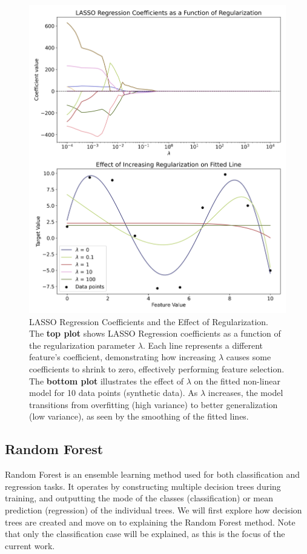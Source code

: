 \documentclass[english,11pt,a4paper,titlepage]{article}
\begin{document}
	\begin{figure}[!t]
		\centering
		\includegraphics[width=1.0\linewidth]{img/lasso_lambda_effect}
		\caption{LASSO Regression Coefficients and the Effect of Regularization. \\ The \textbf{top plot} shows LASSO Regression coefficients as a function of the regularization parameter $\lambda$. Each line represents a different feature's coefficient, demonstrating how increasing $\lambda$ causes some coefficients to shrink to zero, effectively performing feature selection. The \textbf{bottom plot} illustrates the effect of $\lambda$ on the fitted non-linear model for 10 data points (synthetic data). As $\lambda$ increases, the model transitions from overfitting (high variance) to better generalization (low variance), as seen by the smoothing of the fitted lines.}
		\label{fig:lassolambdaeffect}
	\end{figure}
	
	\clearpage
	
	\subsection*{Random Forest}
	Random Forest is an ensemble learning method used for both classification and regression tasks. It operates by constructing multiple decision trees during training, and outputting the mode of the classes (classification) or mean prediction (regression) of the individual trees. We will first explore how decision trees are created and move on to explaining the Random Forest method. Note that only the classification case will be explained, as this is the focus of the current work.
	
\end{document}
